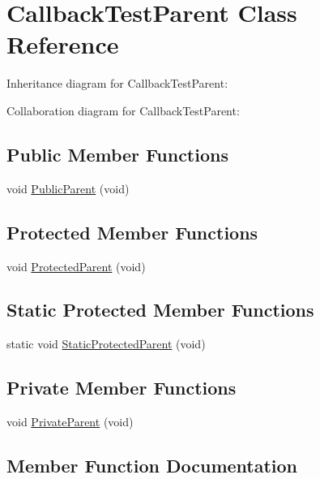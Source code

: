 \hypertarget{classCallbackTestParent}{}\section{Callback\+Test\+Parent Class Reference}
\label{classCallbackTestParent}


Inheritance diagram for Callback\+Test\+Parent\+:


Collaboration diagram for Callback\+Test\+Parent\+:
\subsection*{Public Member Functions}
\begin{DoxyCompactItemize}
\item 
void \hyperlink{classCallbackTestParent_aa19a1a6c713d03d81541ea3ce6e2a66b}{Public\+Parent} (void)
\end{DoxyCompactItemize}
\subsection*{Protected Member Functions}
\begin{DoxyCompactItemize}
\item 
void \hyperlink{classCallbackTestParent_ab976ffcc28afb98fe642cf0a29118136}{Protected\+Parent} (void)
\end{DoxyCompactItemize}
\subsection*{Static Protected Member Functions}
\begin{DoxyCompactItemize}
\item 
static void \hyperlink{classCallbackTestParent_a02c7c8259f37de52e084e0f998b319f9}{Static\+Protected\+Parent} (void)
\end{DoxyCompactItemize}
\subsection*{Private Member Functions}
\begin{DoxyCompactItemize}
\item 
void \hyperlink{classCallbackTestParent_ada7a92864dc99d975e56970d7a53e392}{Private\+Parent} (void)
\end{DoxyCompactItemize}


\subsection{Member Function Documentation}
